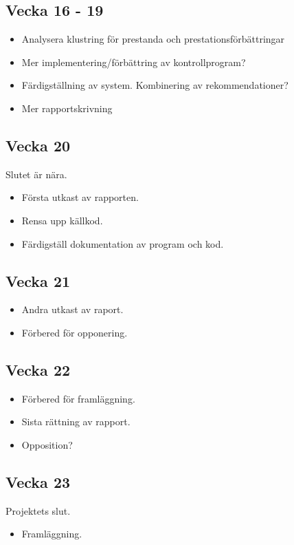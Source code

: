 \documentclass[11pt]{article}
\begin{document}
\subsection*{Vecka 16 - 19}

\begin{itemize}
    \item Analysera klustring för prestanda och prestationsförbättringar
    \item Mer implementering/förbättring av kontrollprogram?
    \item Färdigställning av system. Kombinering av rekommendationer?
    \item Mer rapportskrivning
\end{itemize}


\subsection*{Vecka 20}

Slutet är nära.

\begin{itemize}
    \item Första utkast av rapporten.
    \item Rensa upp källkod.
    \item Färdigställ dokumentation av program och kod.
\end{itemize}

\subsection*{Vecka 21}

\begin{itemize}
    \item Andra utkast av raport.
    \item Förbered för opponering.
\end{itemize}

\subsection*{Vecka 22}

\begin{itemize}
    \item Förbered för framläggning.
    \item Sista rättning av rapport.
    \item Opposition?
\end{itemize}

\subsection*{Vecka 23}

Projektets slut.

\begin{itemize}
    \item Framläggning.
\end{itemize}
\end{document}
